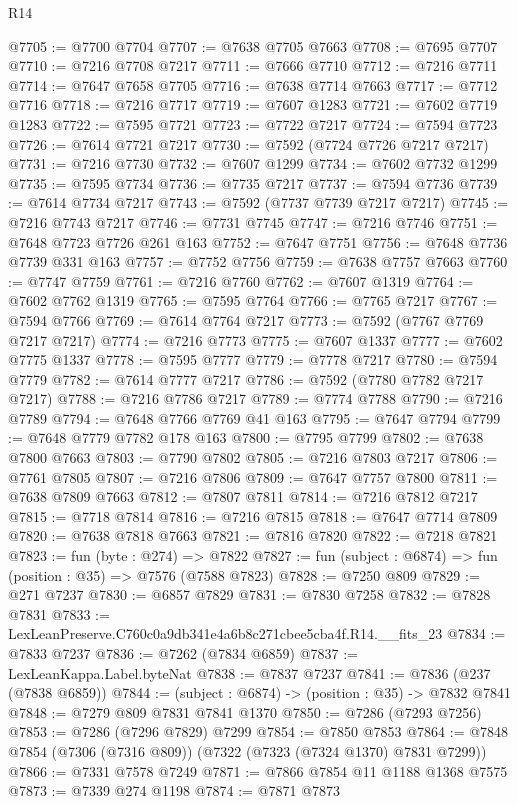 \begin{lexlean}{R14}
\begin{coremodule}
@7705 := @7700 @7704
@7707 := @7638 @7705 @7663
@7708 := @7695 @7707
@7710 := @7216 @7708 @7217
@7711 := @7666 @7710
@7712 := @7216 @7711
@7714 := @7647 @7658 @7705
@7716 := @7638 @7714 @7663
@7717 := @7712 @7716
@7718 := @7216 @7717
@7719 := @7607 @1283
@7721 := @7602 @7719 @1283
@7722 := @7595 @7721
@7723 := @7722 @7217
@7724 := @7594 @7723
@7726 := @7614 @7721 @7217
@7730 := @7592 (@7724 @7726 @7217 @7217)
@7731 := @7216 @7730
@7732 := @7607 @1299
@7734 := @7602 @7732 @1299
@7735 := @7595 @7734
@7736 := @7735 @7217
@7737 := @7594 @7736
@7739 := @7614 @7734 @7217
@7743 := @7592 (@7737 @7739 @7217 @7217)
@7745 := @7216 @7743 @7217
@7746 := @7731 @7745
@7747 := @7216 @7746
@7751 := @7648 @7723 @7726 @261 @163
@7752 := @7647 @7751
@7756 := @7648 @7736 @7739 @331 @163
@7757 := @7752 @7756
@7759 := @7638 @7757 @7663
@7760 := @7747 @7759
@7761 := @7216 @7760
@7762 := @7607 @1319
@7764 := @7602 @7762 @1319
@7765 := @7595 @7764
@7766 := @7765 @7217
@7767 := @7594 @7766
@7769 := @7614 @7764 @7217
@7773 := @7592 (@7767 @7769 @7217 @7217)
@7774 := @7216 @7773
@7775 := @7607 @1337
@7777 := @7602 @7775 @1337
@7778 := @7595 @7777
@7779 := @7778 @7217
@7780 := @7594 @7779
@7782 := @7614 @7777 @7217
@7786 := @7592 (@7780 @7782 @7217 @7217)
@7788 := @7216 @7786 @7217
@7789 := @7774 @7788
@7790 := @7216 @7789
@7794 := @7648 @7766 @7769 @41 @163
@7795 := @7647 @7794
@7799 := @7648 @7779 @7782 @178 @163
@7800 := @7795 @7799
@7802 := @7638 @7800 @7663
@7803 := @7790 @7802
@7805 := @7216 @7803 @7217
@7806 := @7761 @7805
@7807 := @7216 @7806
@7809 := @7647 @7757 @7800
@7811 := @7638 @7809 @7663
@7812 := @7807 @7811
@7814 := @7216 @7812 @7217
@7815 := @7718 @7814
@7816 := @7216 @7815
@7818 := @7647 @7714 @7809
@7820 := @7638 @7818 @7663
@7821 := @7816 @7820
@7822 := @7218 @7821
@7823 := fun (byte : @274) => @7822
@7827 := fun (subject : @6874) => fun (position : @35) => @7576 (@7588 @7823)
@7828 := @7250 @809
@7829 := @271 @7237
@7830 := @6857 @7829
@7831 := @7830 @7258
@7832 := @7828 @7831
@7833 := LexLeanPreserve.C760c0a9db341e4a6b8c271cbee5cba4f.R14.__fits_23
@7834 := @7833 @7237
@7836 := @7262 (@7834 @6859)
@7837 := LexLeanKappa.Label.byteNat
@7838 := @7837 @7237
@7841 := @7836 (@237 (@7838 @6859))
@7844 := (subject : @6874) -> (position : @35) -> @7832 @7841
@7848 := @7279 @809 @7831 @7841 @1370
@7850 := @7286 (@7293 @7256)
@7853 := @7286 (@7296 @7829) @7299
@7854 := @7850 @7853
@7864 := @7848 @7854 (@7306 (@7316 @809)) (@7322 (@7323 (@7324 @1370) @7831 @7299))
@7866 := @7331 @7578 @7249
@7871 := @7866 @7854 @11 @1188 @1368 @7575
@7873 := @7339 @274 @1198
@7874 := @7871 @7873

\end{coremodule}
\end{lexlean}
